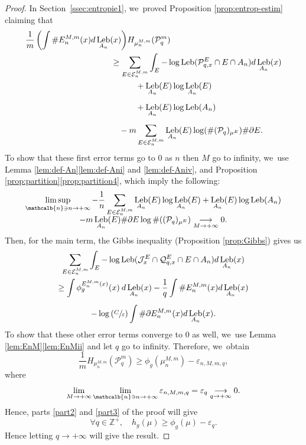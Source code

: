 \documentclass[10pt]{amsart}
\DeclareMathOperator{\Leb}{Leb}
\newcommand{\mcbn}{{\mathcalb{n}}}
\theoremstyle{definition}
\newcommand{\bbZ}{{\mathbb{Z}}}
\begin{document}
\begin{proof}
In Section~\ref{ssec:entropie1}, we~proved Proposition \ref{prop:entrop-estim} claiming that
\begin{align*}
\frac{1}{m} \left (\int \# E_n^{M,m}(x) d \Leb_{A_n}(x) \right) &H_{\mu_n^{M,m}}(\mathcal{P}_q^m)\\
&\hspace{-2em}\geq \sum_{E \in \mathcal{E}_n^{M,m}} \int_E - \log \Leb(\mathcal{P}_{q,x}^E \cap E \cap A_n) d \Leb_{A_n}(x)\\
&\hspace{1em}+ \Leb_{A_n}(E) \log \Leb_{A_n}(E)\\[0.5em]
&\hspace{1em}+ \Leb_{A_n}(E) \log \Leb(A_n)\\[0.5em]
&\hspace{-1em}- m \sum_{E \in \mathcal{E}_n^{M,m}} \Leb_{A_n}(E) \log (\# (\mathcal{P}_q)_{\mu^E}) \# \partial E.
\end{align*}
To show that these first error terms go to $0$ as $n$ then $M$ go to infinity, we~use Lemma \ref{lem:def-An}\eqref{lem:def-Ani} and \eqref{lem:def-Aniv}, and Proposition \ref{prop:partition}\eqref{prop:partition4}, which imply the following:\vspace{-5pt}
\begin{multline*}
\limsup_{\mcbn \ni n \to +\infty}-\frac{1}{n}\sum_{E \in \mathcal{E}_n^{M,m}} \Leb_{A_n}(E) \log \Leb_{A_n}(E) + \Leb_{A_n}(E) \log \Leb(A_n)\\[-5pt]
-m \Leb_{A_n}(E) \# \partial E \log \# ((\mathcal{P}_q)_{\mu^E}) \underset{M \to +\infty}{\longrightarrow} 0.
\end{multline*}
Then, for the main term, the Gibbs inequality (Proposition \ref{prop:Gibbs}) gives us
\begin{multline*}
\sum_{E \in \mathcal{E}_n^{M,m}} \int_E - \log \Leb(\mathcal{J}^E_x \cap \mathcal{Q}_{q,x}^E \cap E \cap A_n) d \Leb_{A_n}(x)\\
\geq \int \phi_g^{E_n^{M,m}(x)}(x) \: d \Leb_{A_n}(x) - \frac{1}{q} \int \# E_n^{M,m}(x) d \Leb_{A_n}(x)\\[0.5em]
- \log \left (\sfrac{C}{\varepsilon} \right) \int \# \partial E_n^{M,m}(x) d \Leb_{A_n}(x).
\end{multline*}
To show that these other error terms converge to $0$ as well, we~use Lemma \ref{lem:EnM}\eqref{lem:EnMii} and let $q$ go to infinity. Therefore, we~obtain
\[
\frac{1}{m} H_{\mu_n^{M,m}}(\mathcal{P}_q^m)
\geq \phi_g(\mu_n^{M,m}) - \varepsilon_{n,M,m,q},
\]
where
\[
\lim_{M \to +\infty} \lim_{\mcbn \ni n \to +\infty}\varepsilon_{n,M,m,q} = \varepsilon_q \underset{q \to +\infty}{\longrightarrow} 0.
\]
Hence, parts \ref{part2} and \ref{part3} of the proof will give
\[
\forall q \in \bbZ^+,\quad h_g(\mu) \geq \phi_g(\mu) - \varepsilon_q.
\]
Hence letting $q \to +\infty$ will give the result.


\end{proof}
\end{document}
